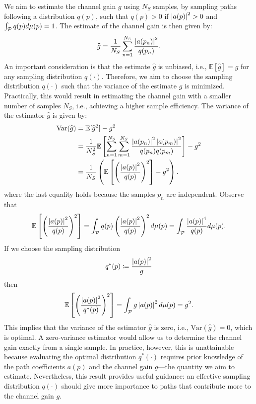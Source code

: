 We aim to estimate the channel gain $g$ using $N_S$ samples, by sampling paths following a distribution $q(p)$, such that $q(p) > 0$ if $\left| a(p) \right|^2 > 0$ and $\int_{{\cal P}} q(p) d\mu(p) = 1$.
The estimate of the channel gain is then given by:
\begin{equation}
    \widehat{g} = \frac{1}{N_S} \sum_{n=1}^{N_S} \frac{\left| a(p_n) \right|^2}{q(p_n)}. \label{eq:channel-gain-estimate}
\end{equation}
An important consideration is that the estimate $\widehat{g}$ is unbiased, i.e., $\mathbb{E}[\widehat{g}] = g$ for any sampling distribution $q(\cdot)$.
Therefore, we aim to choose the sampling distribution $q(\cdot)$ such that the variance of the estimate $\widehat{g}$ is minimized.
Practically, this would result in estimating the channel gain with a smaller number of samples $N_S$, i.e., achieving a higher sample efficiency.
The variance of the estimator $\widehat{g}$ is given by:
\begin{align}
    \text{Var}(\widehat{g}) &= \mathbb{E}[\widehat{g}^2] - g^2 \\
                            &= \frac{1}{N_S^2}\mathbb{E}\left[ \sum_{n=1}^{N_S} \sum_{m=1}^{N_S} \frac{\left| a(p_n) \right|^2 \left| a(p_m) \right|^2}{q(p_n) q(p_m)} \right] - g^2 \\
                            &= \frac{1}{N_S}\left(\mathbb{E} \left[ \left( \frac{\left| a(p) \right|^2}{q(p)} \right)^2 \right] - g^2\right).
\end{align}
where the last equality holds because the samples $p_n$ are independent.
Observe that
\begin{equation}
    \mathbb{E} \left[ \left( \frac{\left| a(p) \right|^2}{q(p)} \right)^2 \right]
    = \int_{{\cal P}} q(p) \left( \frac{\left| a(p) \right|^2}{q(p)} \right)^2 d\mu(p)
    = \int_{{\cal P}} \frac{\left| a(p) \right|^4}{q(p)} d\mu(p).
\end{equation}
If we choose the sampling distribution
\begin{equation}
    q^*(p) \coloneqq \frac{\left| a(p) \right|^2}{g}
\end{equation}
then
\begin{equation}
    \mathbb{E} \left[ \left( \frac{\left| a(p) \right|^2}{q^*(p)} \right)^2 \right]
    = \int_{{\cal P}} g \left| a(p) \right|^2 d\mu(p)
    = g^2.
\end{equation}
This implies that the variance of the estimator $\widehat{g}$ is zero, i.e., $\text{Var}(\widehat{g}) = 0$, which is optimal. A zero-variance estimator would allow us to determine the channel gain exactly from a single sample. In practice, however, this is unattainable because evaluating the optimal distribution $q^*(\cdot)$ requires prior knowledge of the path coefficients $a(p)$ and the channel gain $g$—the quantity we aim to estimate. Nevertheless, this result provides useful guidance: an effective sampling distribution $q(\cdot)$ should give more importance to paths that contribute more to the channel gain $g$.
